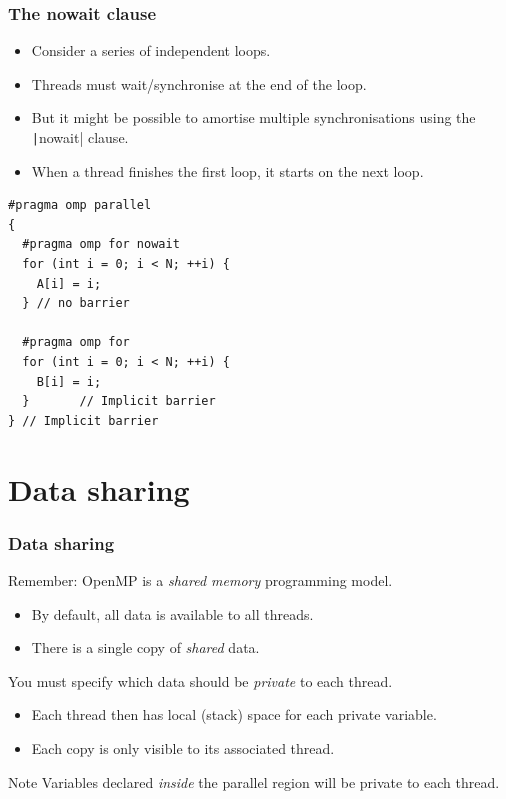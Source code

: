 \documentclass[aspectratio=169]{beamer}
\begin{document}
\begin{frame}[fragile]
\frametitle{The nowait clause}
\begin{itemize}
  \item Consider a series of independent loops.
  \item Threads must wait/synchronise at the end of the loop.
  \item But it might be possible to amortise multiple synchronisations using the \texttt|nowait| clause.
  \item When a thread finishes the first loop, it starts on the next loop.
\end{itemize}

\begin{verbatim}
#pragma omp parallel
{
  #pragma omp for nowait
  for (int i = 0; i < N; ++i) {
    A[i] = i;
  } // no barrier

  #pragma omp for
  for (int i = 0; i < N; ++i) {
    B[i] = i;
  }       // Implicit barrier
} // Implicit barrier
\end{verbatim}
\end{frame}


\section{Data sharing}
\begin{frame}
\frametitle{Data sharing}
Remember: OpenMP is a \emph{shared memory} programming model.
\begin{itemize}
  \item By default, all data is available to all threads.
  \item There is a single copy of \emph{shared} data.
\end{itemize}

\vfill

You must specify which data should be \emph{private} to each thread.
\begin{itemize}
  \item Each thread then has local (stack) space for each private variable.
  \item Each copy is only visible to its associated thread.
\end{itemize}

\begin{block}{Note}
Variables declared \emph{inside} the parallel region will be private to each thread.
\end{block}

\end{frame}
\end{document}
